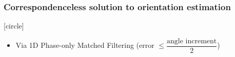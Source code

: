 \begin{frame}[noframenumbering]

  \frametitle{Correspondenceless solution to orientation estimation}


  \vspace{0.1cm}
  [circle]
  \begin{itemize}
    \item Via 1D Phase-only Matched Filtering (error $\leq \dfrac{\text{angle increment}}{2}$)
  \end{itemize}
  \vspace{-0.25cm}

  \begin{center}
  \end{center}

\end{frame}
